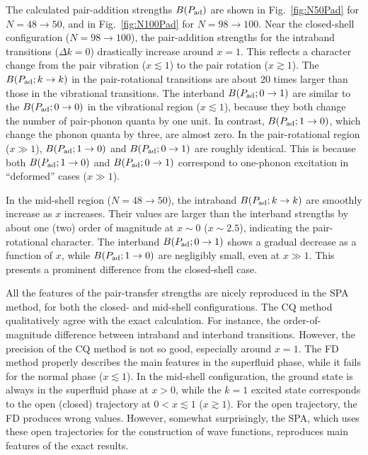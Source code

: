 \documentclass[%
superscriptaddress,
preprint,
showpacs,
nofootinbib,
amsmath,amssymb,
aps,
prc,
floatfix ]%
{revtex4-1}
\begin{document}
The calculated pair-addition strengths $B(P_{\rm ad})$ are shown in
Fig.~\ref{fig:N50Pad} for $N=48\rightarrow 50$,
and in Fig.~\ref{fig:N100Pad} for $N=98\rightarrow 100$.
Near the closed-shell configuration ($N=98\rightarrow 100$),
the pair-addition strengths for the intraband transitions ($\Delta k=0$)
drastically increase around $x=1$.
This reflects a character change from the pair vibration ($x\lesssim 1$)
to the pair rotation ($x\gtrsim 1$).
The $B(P_{\rm ad}; k\rightarrow k)$ in the pair-rotational transitions
are about 20 times larger than those in the vibrational transitions.
The interband $B(P_{\rm ad}; 0\rightarrow 1)$ are similar to
the $B(P_{\rm ad}; 0\rightarrow 0)$ in the vibrational region
($x\lesssim 1$), because they both change the number of pair-phonon quanta
by one unit.
In contrast, $B(P_{\rm ad}; 1\rightarrow 0)$, which change the phonon
quanta by three, are almost zero.
In the pair-rotational region ($x \gg 1$),
$B(P_{\rm ad}; 1\rightarrow 0)$ and $B(P_{\rm ad}; 0\rightarrow 1)$
are roughly identical. This is because both $B(P_{\rm ad}; 1\rightarrow 0)$ 
and $B(P_{\rm ad}; 0\rightarrow 1)$ correspond to one-phonon excitation
in ``deformed'' cases ($x \gg 1$).

In the mid-shell region ($N=48\rightarrow 50$),
the intraband $B(P_{\rm ad}; k\rightarrow k)$ are smoothly increase as
$x$ increases.
Their values are larger than the interband strengths by about one (two) order
of magnitude at $x\sim 0$ ($x\sim 2.5$),
indicating the pair-rotational character.
The interband $B(P_{\rm ad}; 0\rightarrow 1)$ shows a gradual decrease
as a function of $x$, while
$B(P_{\rm ad}; 1\rightarrow 0)$ are negligibly small,
even at $x\gg 1$.
This presents a prominent difference from the closed-shell case.

All the features of the pair-transfer strengths
are nicely reproduced in the SPA method,
for both the closed- and mid-shell configurations.
The CQ method qualitatively agree with the exact calculation.
For instance, the order-of-magnitude difference between intraband
and interband transitions.
However, the precision of the CQ method is not so good,
especially around $x=1$.
The FD method properly describes the main features
in the superfluid phase, while it fails for the normal phase
($x\lesssim 1$). 
In the mid-shell configuration, the ground state is always
in the superfluid phase at $x>0$,
while the $k=1$ excited state corresponds to
the open (closed) trajectory at $0<x\lesssim 1$ ($x\gtrsim 1$).
For the open trajectory, the FD produces wrong values.
However, somewhat surprisingly,
the SPA, which uses these open trajectories for the construction
of wave functions,
reproduces main features of the exact results.
\end{document}
